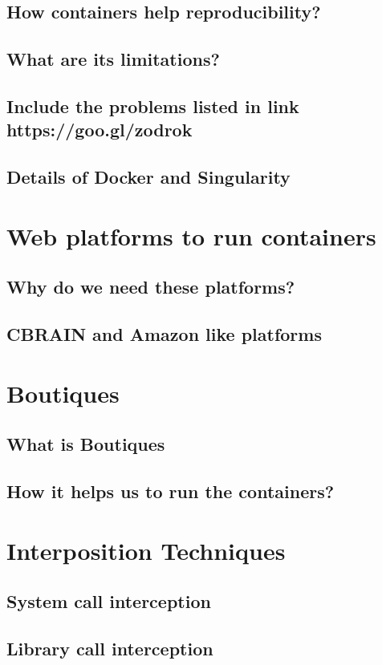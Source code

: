 \subsection{How containers help reproducibility?}
\subsection{What are its limitations?}
\subsection{Include the problems listed in link https://goo.gl/zodrok}
\subsection{Details of Docker and Singularity}

\section{Web platforms to run containers}
\subsection{Why do we need these platforms?}
\subsection{CBRAIN and Amazon like platforms}

\section{Boutiques}
\subsection{What is Boutiques}
\subsection{How it helps us to run the containers?}

\section{Interposition Techniques}
\subsection{System call interception}
\subsection{Library call interception}

